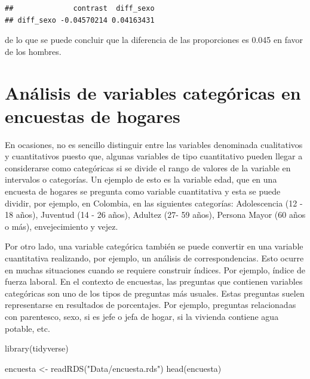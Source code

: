 \documentclass[
  12pt,
]{book}
\newenvironment{Shaded}{\begin{snugshade}}{\end{snugshade}}
\newcommand{\FunctionTok}[1]{\textcolor[rgb]{0.00,0.00,0.00}{#1}}
\newcommand{\NormalTok}[1]{#1}
\newcommand{\OtherTok}[1]{\textcolor[rgb]{0.56,0.35,0.01}{#1}}
\newcommand{\StringTok}[1]{\textcolor[rgb]{0.31,0.60,0.02}{#1}}
\begin{document}
\begin{verbatim}
##              contrast  diff_sexo
## diff_sexo -0.04570214 0.04163431
\end{verbatim}

de lo que se puede concluir que la diferencia de las proporciones es 0.045 en favor de los hombres.

\hypertarget{anuxe1lisis-de-variables-categuxf3ricas-en-encuestas-de-hogares}{%
\chapter{Análisis de variables categóricas en encuestas de hogares}\label{anuxe1lisis-de-variables-categuxf3ricas-en-encuestas-de-hogares}}

En ocasiones, no es sencillo distinguir entre las variables denominada cualitativos y cuantitativos puesto que, algunas variables de tipo cuantitativo pueden llegar a considerarse como categóricas si se divide el rango de valores de la variable en intervalos o categorías. Un ejemplo de esto es la variable edad, que en una encuesta de hogares se pregunta como variable cuantitativa y esta se puede dividir, por ejemplo, en Colombia, en las siguientes categorías: Adolescencia (12 - 18 años), Juventud (14 - 26 años), Adultez (27- 59 años), Persona Mayor (60 años o más), envejecimiento y vejez.

Por otro lado, una variable categórica también se puede convertir en una variable cuantitativa realizando, por ejemplo, un análisis de correspondencias. Esto ocurre en muchas situaciones cuando se requiere construir índices. Por ejemplo, índice de fuerza laboral. En el contexto de encuestas, las preguntas que contienen variables categóricas son uno de los tipos de preguntas más usuales. Estas preguntas suelen representarse en resultados de porcentajes. Por ejemplo, preguntas relacionadas con parentesco, sexo, si es jefe o jefa de hogar, si la vivienda contiene agua potable, etc.

\begin{Shaded}
\begin{Highlighting}[]
\FunctionTok{library}\NormalTok{(tidyverse)}

\NormalTok{encuesta }\OtherTok{\textless{}{-}} \FunctionTok{readRDS}\NormalTok{(}\StringTok{"Data/encuesta.rds"}\NormalTok{)}
\FunctionTok{head}\NormalTok{(encuesta)}
\end{Highlighting}
\end{Shaded}
\end{document}
